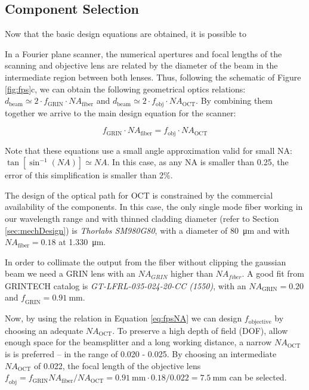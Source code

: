 \subsection{Component Selection}
Now that the basic design equations are obtained, it is possible to 

In a Fourier plane scanner, the numerical apertures and focal lengths of the scanning and objective lens are related by the diameter of the beam in the intermediate region between both lenses. Thus, following the schematic of Figure \ref{fig:fps}c, we can obtain the following geometrical optics relations: $d_\mathrm{beam} \simeq 2\cdot f_\mathrm{GRIN}\cdot \mathit{NA}_\mathrm{fiber}$ and $d_\mathrm{beam} \simeq 2 \cdot f_\mathrm{obj}\cdot \mathit{NA}_\mathrm{OCT}$. By combining them together we arrive to the main design equation for the scanner:

\begin{equation}
f_\mathrm{GRIN} \cdot \mathit{NA}_\mathrm{fiber} = f_\mathrm{obj} \cdot \mathit{NA}_\mathrm{OCT}
\end{equation}

Note that these equations use a small angle approximation valid for small NA: \\ $\tan[	\sin^{-1}(\mathit{NA})] \simeq \mathit{NA} $. In this case, as any NA is smaller than 0.25, the error of this simplification is smaller than 2\%.

The design of the optical path for OCT is constrained by the commercial availability of the components. In this case, the only single mode fiber working in our wavelength range and with thinned cladding diameter (refer to Section \ref{sec:mechDesign}) is \textit{Thorlabs SM980G80}, with a diameter of \SI{80}{\micro\meter} and with $\mathit{NA_\mathrm{fiber}} = 0.18$ at \SI{1.330}{\micro\meter}. 

In order to collimate the output from the fiber without clipping the gaussian beam we need a GRIN lens with an $\mathit{NA_{GRIN}}$ higher than $\mathit{NA_{fiber}}$. A good fit from GRINTECH catalog is \textit{GT-LFRL-035-024-20-CC (1550)}, with an $\mathit{NA_\mathrm{GRIN}} = 0.20$ and $\mathit{f_\mathrm{GRIN}} = \SI{0.91}{\milli\meter}$. 

Now, by using the relation in Equation \ref{eq:fpsNA} we can design $f_\mathrm{objective}$ by choosing an adequate $\mathit{NA_\mathrm{OCT}}$. To preserve a high depth of field (DOF), allow enough space for the beamsplitter and a long working distance, a narrow $\mathit{NA_\mathrm{OCT}}$ is is preferred -- in the range of 0.020 - 0.025. By choosing an intermediate $\mathit{NA_\mathrm{OCT}}$ of 0.022, the focal length of the objective lens $\mathit{f_\mathrm{obj}} = f_\mathrm{GRIN} \mathit{NA_\mathrm{fiber}} / \mathit{NA_\mathrm{OCT}}  = \SI{0.91}{\milli\meter} \cdot 0.18/0.022 = \SI{7.5}{\milli\meter}$ can be selected.

